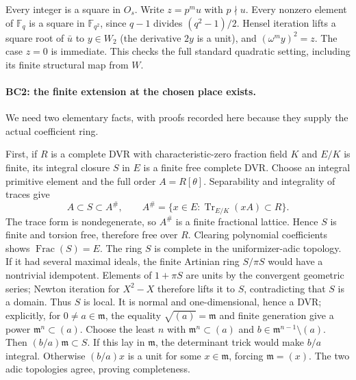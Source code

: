 \documentclass[11pt,a4paper]{article}
\numberwithin{equation}{section}
\theoremstyle{remark}\newtheorem{remark}[theorem]{Remark}
\begin{document}
Every integer is a square in $O_s$. Write $z=p^m u$ with $p\nmid u$.
Every nonzero element of $\mathbb F_q$ is a square in
$\mathbb F_{q^2}$, since $q-1$ divides $(q^2-1)/2$.
Hensel iteration lifts a square root of $\bar u$ to $y\in W_2$
(the derivative $2y$ is a unit), and $(\omega^m y)^2=z$.
The case $z=0$ is immediate. This checks the full standard quadratic
setting, including its finite structural map from $W$.

\paragraph{BC2: the finite extension at the chosen place exists.}
We need two elementary facts, with proofs recorded here because they
supply the actual coefficient ring.

First, if $R$ is a complete DVR with characteristic-zero fraction field
$K$ and $E/K$ is finite, its integral closure $S$ in $E$ is a finite
free complete DVR. Choose an integral primitive element and the full
order $A=R[\theta]$. Separability and integrality of traces give
\[
 A\subset S\subset A^\#,
 \qquad A^\#=\{x\in E:\operatorname{Tr}_{E/K}(xA)\subset R\}.
                                                               \tag{BC.2}
\]
The trace form is nondegenerate, so $A^\#$ is a finite fractional
lattice. Hence $S$ is finite and torsion free, therefore free over $R$.
Clearing polynomial coefficients shows $\operatorname{Frac}(S)=E$.
The ring $S$ is complete in the uniformizer-adic topology. If it had
several maximal ideals, the finite Artinian ring $S/\pi S$ would
have a nontrivial idempotent. Elements of $1+\pi S$ are units by the
convergent geometric series; Newton iteration for $X^2-X$ therefore lifts it
to $S$, contradicting that $S$ is a domain. Thus $S$ is local.
It is normal and one-dimensional, hence a DVR; explicitly, for
$0\ne a\in\mathfrak m$, the equality $\sqrt{(a)}=\mathfrak m$
and finite generation give a power $\mathfrak m^n\subset(a)$. Choose the least $n$ with
$\mathfrak m^n\subset(a)$ and $b\in\mathfrak m^{n-1}\setminus(a)$.
Then $(b/a)\mathfrak m\subset S$. If this lay in $\mathfrak m$,
the determinant trick would make $b/a$ integral. Otherwise
$(b/a)x$ is a unit for some $x\in\mathfrak m$, forcing
$\mathfrak m=(x)$. The two adic topologies agree, proving completeness.
\end{document}
